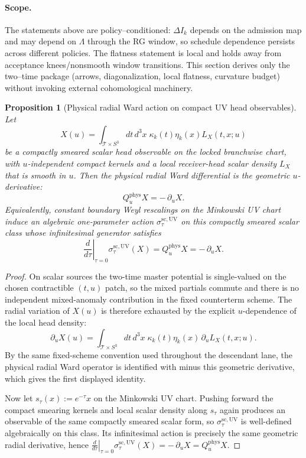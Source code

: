 \documentclass[10pt]{article}
\theoremstyle{definition}
\theoremstyle{plain}
\newtheorem{proposition}{Proposition}[section]
\begin{document}
\paragraph{Scope.}\label{par:uom-main-096}
The statements above are policy--conditioned: $\Delta I_k$ depends on the admission map and may depend on
$\Lambda$ through the RG window, so schedule dependence persists across different policies. The flatness
statement is local and holds away from acceptance knees/nonsmooth window transitions. This section derives
only the two--time package (arrows, diagonalization, local flatness, curvature budget) without invoking
external cohomological machinery.

\begin{proposition}[Physical radial Ward action on compact UV head observables]
\label{prop:uom-uv-radial-ward}
Let
\[
X(u)=\int_{\mathscr T\times S^3}dt\,d^3x\;\kappa_k(t)\eta_k(x)L_X(t,x;u)
\]
be a compactly smeared scalar head observable on the locked branchwise
chart, with \(u\)-independent compact kernels and a local receiver-head
scalar density \(L_X\) that is smooth in \(u\).
Then the physical radial Ward differential is the geometric
\(u\)-derivative:
\[
Q_u^{\mathrm{phys}}X=-\,\partial_u X.
\]
Equivalently, constant boundary Weyl rescalings on the Minkowski UV
chart induce an algebraic one-parameter action
\(\sigma_\tau^{\mathrm{sc,UV}}\) on this compactly smeared scalar class
whose infinitesimal generator satisfies
\[
\left.\frac{d}{d\tau}\right|_{\tau=0}\sigma_\tau^{\mathrm{sc,UV}}(X)
=Q_u^{\mathrm{phys}}X=-\,\partial_u X.
\]
\end{proposition}

\begin{proof}
On scalar sources the two-time master potential is single-valued on the
chosen contractible \((t,u)\) patch, so the mixed partials commute and
there is no independent mixed-anomaly contribution in the fixed
counterterm scheme.  The radial variation of \(X(u)\) is therefore
exhausted by the explicit \(u\)-dependence of the local head density:
\[
\partial_u X(u)
=
\int_{\mathscr T\times S^3}dt\,d^3x\;\kappa_k(t)\eta_k(x)\,\partial_u L_X(t,x;u).
\]
By the same fixed-scheme convention used throughout the descendant lane,
the physical radial Ward operator is identified with minus this
geometric derivative, which gives the first displayed identity.

Now let \(s_\tau(x):=e^{-\tau}x\) on the Minkowski UV chart.  Pushing
forward the compact smearing kernels and local scalar density along
\(s_\tau\) again produces an observable of the same compactly smeared
scalar form, so \(\sigma_\tau^{\mathrm{sc,UV}}\) is well-defined
algebraically on this class.  Its infinitesimal action is precisely the
same geometric radial derivative, hence
\(
\left.\frac{d}{d\tau}\right|_{\tau=0}\sigma_\tau^{\mathrm{sc,UV}}(X)
=-\,\partial_u X
=Q_u^{\mathrm{phys}}X
\).
\end{proof}
\end{document}
